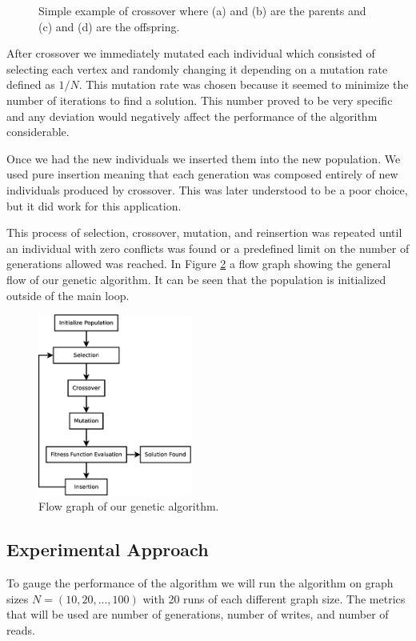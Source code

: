 \documentclass{article}
\begin{document}
\begin{figure}[h!]
\begin{subfigure}{0.18\textwidth}
		\end{subfigure}
		
		\caption{Simple example of crossover where (a) and (b) are the parents and (c) and (d) are the offspring.}
		\label{cross_example}
	\end{figure}
	
	After crossover we immediately mutated each individual which consisted of selecting each vertex and randomly changing it depending on a mutation rate defined as $1/N$. This mutation rate was chosen because it seemed to minimize the number of iterations to find a solution. This number proved to be very specific and any deviation would negatively affect the performance of the algorithm considerable. 
	
	Once we had the new individuals we inserted them into the new population. We used pure insertion meaning that each generation was composed entirely of new individuals produced by crossover. This was later understood to be a poor choice, but it did work for this application. 
	
	This process of selection, crossover, mutation, and reinsertion was repeated until an individual with zero conflicts was found or a predefined limit on the number of generations allowed was reached. In Figure \ref{genetic_flow} a flow graph showing the general flow of our genetic algorithm. It can be seen that the population is initialized outside of the main loop. 
	
	\begin{figure}[h!]
		\centering
		\includegraphics[width=0.45\textwidth]{images/genetic_flo}
		\caption{Flow graph of our genetic algorithm.}
		\label{genetic_flow}
	\end{figure}
	
	\subsection{Experimental Approach}
	To gauge the performance of the algorithm we will run the algorithm on graph sizes $N = (10, 20, ..., 100)$ with 20 runs of each different graph size. The metrics that will be used are number of generations, number of writes, and number of reads.
	
\end{document}
